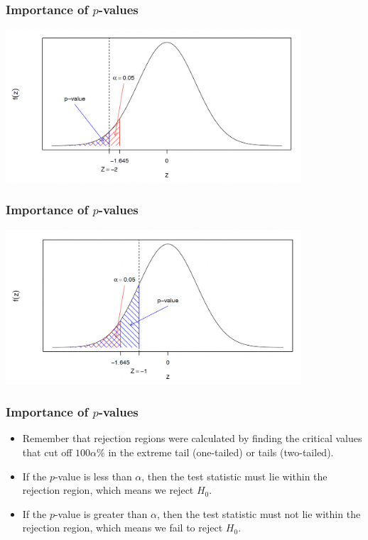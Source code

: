 \documentclass[14pt]{beamer}
\begin{document}
\begin{frame}
	\frametitle{Importance of $p$-values}
	
\centering
\includegraphics[width=11cm]{importance1.png}	
	
\end{frame}
\begin{frame}
	\frametitle{Importance of $p$-values}
	
	\centering
	\includegraphics[width=11cm]{importance2.png}	
	
\end{frame}
\begin{frame}
	\frametitle{Importance of $p$-values}
	
	\begin{itemize}[label={\color{blue}$\blacktriangleright$}]
		\item Remember that rejection regions were calculated by finding the critical values that cut off $100\alpha\%$ in the extreme tail (one-tailed) or tails (two-tailed).
		
		\item If the $p$-value is less than $\alpha$, then the test statistic must lie within the rejection region, which means we reject $H_0$.
		
		\item If the $p$-value is greater than $\alpha$, then the test statistic must not lie within the rejection region, which means we fail to reject $H_0$.
	\end{itemize}
	
\end{frame}
\end{document}

